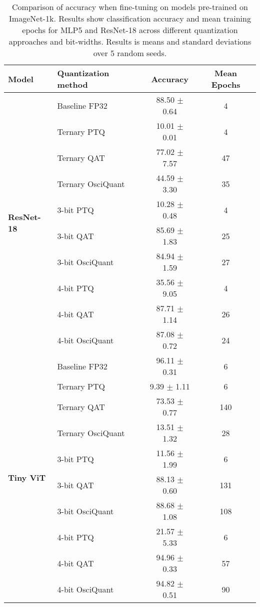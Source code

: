 \begin{table}[t]
\centering
\scriptsize
\begin{tabular}{llcc}
\toprule
{\bf Model} & {\bf Quantization method} & {\bf Accuracy} & {\bf Mean Epochs} \\
\midrule
\multirow{10}{*}{\bf ResNet-18} 
 & Baseline FP32 & 88.50 $\pm$ 0.64 &  4\\
 \cmidrule(lr){2-4}
 & Ternary PTQ & 10.01 $\pm$ 0.01 & 4 \\
 & Ternary QAT & 77.02 $\pm$ 7.57 & 47 \\
 & Ternary OsciQuant & 44.59 $\pm$ 3.30 & 35 \\
 \cmidrule(lr){2-4}
 & 3-bit PTQ & 10.28 $\pm$ 0.48 & 4 \\
 & 3-bit QAT & 85.69 $\pm$ 1.83 & 25\\
 & 3-bit OsciQuant & 84.94 $\pm$ 1.59 & 27\\
 \cmidrule(lr){2-4}
 & 4-bit PTQ & 35.56 $\pm$ 9.05 & 4 \\
 & 4-bit QAT & 87.71 $\pm$ 1.14 & 26\\
 & 4-bit OsciQuant & 87.08 $\pm$ 0.72 & 24\\
\midrule

\multirow{10}{*}{\bf Tiny ViT}
 & Baseline FP32 & 96.11 $\pm$ 0.31 &  6\\
 \cmidrule(lr){2-4}
 & Ternary PTQ & 9.39 $\pm$ 1.11 & 6 \\
 & Ternary QAT & 73.53 $\pm$ 0.77 & 140 \\
 & Ternary OsciQuant & 13.51 $\pm$ 1.32 & 28 \\
 \cmidrule(lr){2-4}
 & 3-bit PTQ & 11.56 $\pm$ 1.99 & 6 \\
 & 3-bit QAT & 88.13 $\pm$ 0.60 & 131 \\
 & 3-bit OsciQuant & 88.68 $\pm$ 1.08 & 108 \\
 \cmidrule(lr){2-4}
 & 4-bit PTQ & 21.57 $\pm$ 5.33 & 6 \\
 & 4-bit QAT & 94.96 $\pm$ 0.33 & 57 \\
 & 4-bit OsciQuant & 94.82 $\pm$ 0.51 & 90 \\
\bottomrule

\end{tabular}
\caption{Comparison of accuracy when fine-tuning on models pre-trained on ImageNet-1k. Results show classification accuracy and mean training epochs for MLP5 and ResNet-18 across different quantization approaches and bit-widths. Results is means and standard deviations over 5 random seeds.}
\label{tab:quant_results}
\end{table}

